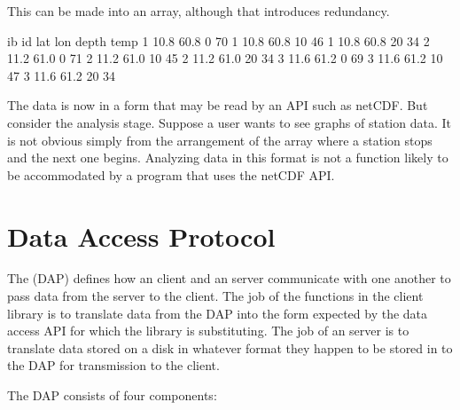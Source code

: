 This can be made into an array, although that introduces redundancy.

\begin{vcode}{ib}
id   lat   lon   depth  temp
1   10.8   60.8    0     70
1   10.8   60.8   10     46
1   10.8   60.8   20     34
2   11.2   61.0    0     71
2   11.2   61.0   10     45
2   11.2   61.0   20     34
3   11.6   61.2    0     69
3   11.6   61.2   10     47
3   11.6   61.2   20     34
\end{vcode}

The data is now in a form that may be read by an API such as
netCDF. But consider the analysis stage. Suppose a user wants to see
graphs of station data. It is not obvious simply from the arrangement
of the array where a station stops and the next one begins. Analyzing
data in this format is not a function likely to be accommodated by a
program that uses the netCDF API.

\section{Data Access Protocol}
\label{data,dap}
 
 

The \opendap {} (DAP) defines how an \opendap client
and an \opendap server communicate with one another to pass data from the
server to the client. The job of the functions in the \opendap client
library is to translate data from the DAP into the form expected by
the data access API for which the \opendap library is substituting. The
job of an \opendap server is to translate data stored on a disk in whatever
format they happen to be stored in to the DAP for transmission to the
client.

The DAP consists of four components:

